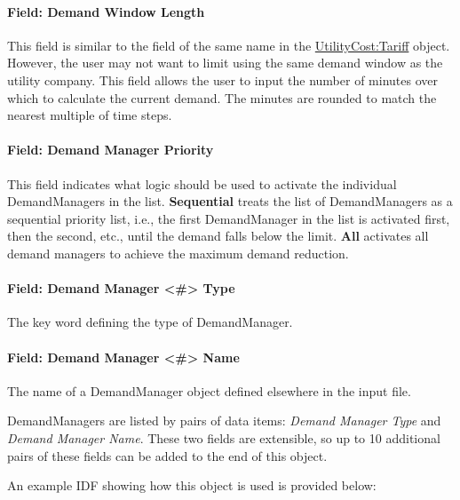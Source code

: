 \paragraph{Field: Demand Window Length}\label{field-demand-window-length}

This field is similar to the field of the same name in the \hyperref[utilitycosttariff]{UtilityCost:Tariff} object. However, the user may not want to limit using the same demand window as the utility company. This field allows the user to input the number of minutes over which to calculate the current demand. The minutes are rounded to match the nearest multiple of time steps.

\paragraph{Field: Demand Manager Priority}\label{field-demand-manager-priority}

This field indicates what logic should be used to activate the individual DemandManagers in the list. \textbf{Sequential} treats the list of DemandManagers as a sequential priority list, i.e., the first DemandManager in the list is activated first, then the second, etc., until the demand falls below the limit. \textbf{All} activates all demand managers to achieve the maximum demand reduction.

\paragraph{Field: Demand Manager \textless{}\#\textgreater{} Type}\label{field-demand-manager-type-1}

The key word defining the type of DemandManager.

\paragraph{Field: Demand Manager \textless{}\#\textgreater{} Name}\label{field-demand-manager-name-1}

The name of a DemandManager object defined elsewhere in the input file.

DemandManagers are listed by pairs of data items: \emph{Demand Manager Type} and \emph{Demand Manager Name}. These two fields are extensible, so up to 10 additional pairs of these fields can be added to the end of this object.

An example IDF showing how this object is used is provided below:

